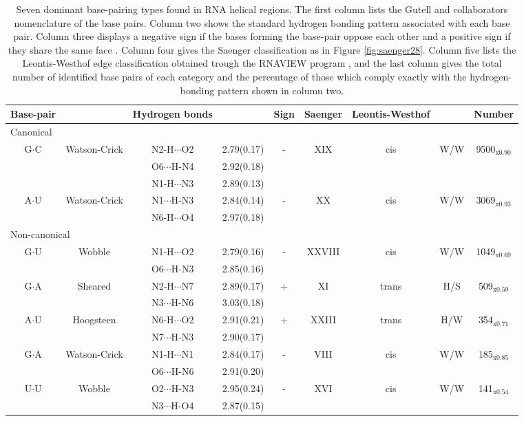 \begin{table}
\begin{center}
\begin{tabular}{|c c|c c|c|c|c c|c|}
\hline
Base-pair & & Hydrogen bonds &  & Sign & Saenger & Leontis-Westhof & &
Number \\
\hline
\hline
\multicolumn{9}{|l|}{Canonical} \\
\hline
G$\cdot$C & Watson-Crick & N2-H$\cdots$O2 & 2.79(0.17) & - & XIX & cis
 & W/W & 9500$_{\text{x0.90}}$ \\
 & & O6$\cdots$H-N4 & 2.92(0.18) & & & & &  \\
 & & N1-H$\cdots$N3 & 2.89(0.13) & & & & &  \\
\hline
A$\cdot$U & Watson-Crick & N1$\cdots$H-N3 & 2.84(0.14) & - & XX & cis
& W/W & 3069$_{\text{x0.93}}$ \\
 & & N6-H$\cdots$O4 & 2.97(0.18) & & & & &  \\
\hline
\multicolumn{9}{|l|}{Non-canonical} \\
\hline
G$\cdot$U & Wobble & N1-H$\cdots$O2 & 2.79(0.16) & - & XXVIII & cis
 & W/W & 1049$_{\text{x0.69}}$ \\
 & & O6$\cdots$H-N3 & 2.85(0.16) & & & & &  \\
\hline
G$\cdot$A & Sheared & N2-H$\cdots$N7 & 2.89(0.17) & + & XI & trans
 & H/S & 509$_{\text{x0.59}}$ \\
 & & N3$\cdots$H-N6 & 3.03(0.18) & & & & &  \\
\hline
A$\cdot$U & Hoogsteen & N6-H$\cdots$O2 & 2.91(0.21) & + & XXIII & trans
 & H/W & 354$_{\text{x0.71}}$ \\
 & & N7$\cdots$H-N3 & 2.90(0.17) & & & & &  \\
\hline
G$\cdot$A & Watson-Crick & N1-H$\cdots$N1 & 2.84(0.17) & - & VIII & cis
 & W/W & 185$_{\text{x0.85}}$ \\
 & & O6$\cdots$H-N6 & 2.91(0.20) & & & & &  \\
\hline
U$\cdot$U & Wobble & O2$\cdots$H-N3 & 2.95(0.24) & - & XVI & cis
 & W/W & 141$_{\text{x0.54}}$ \\
 & & N3$\cdots$H-O4 & 2.87(0.15) & & & & &  \\
\hline
\end{tabular}
\caption{Seven  dominant  base-pairing  types  found  in  RNA  helical
regions.   The  first  column   lists  the  Gutell  and  collaborators
nomenclature \cite{lee2004}  of the base  pairs. Column two  shows the
standard  hydrogen bonding  pattern  associated with  each base  pair.
Column  three  displays a  negative  sign  if  the bases  forming  the
base-pair oppose each other and a positive sign if they share the same
face \cite{lu2003}.   Column four gives the  Saenger classification as
in Figure \ref{fig:saenger28}.   Column five lists the Leontis-Westhof
edge    classification   obtained    trough   the    RNAVIEW   program
\cite{yang2003},  and  the  last  column  gives the  total  number  of
identified base  pairs of  each category and  the percentage  of those
which comply exactly with the hydrogen-bonding pattern shown in column
two.}
\label{tab:seven}
\end{center}  
\end{table}  


